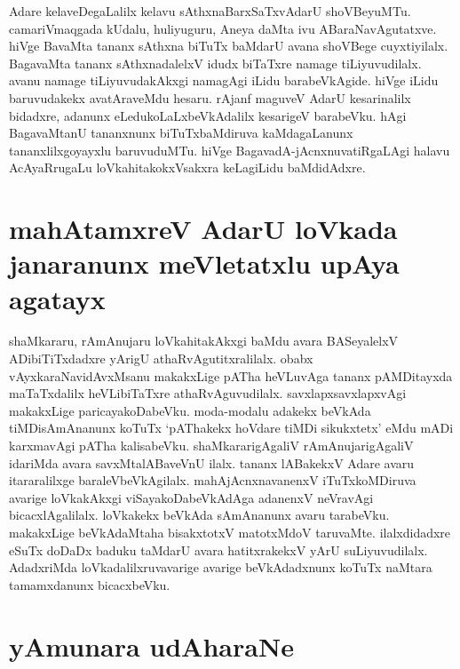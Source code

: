 Adare kelaveDegaLalilx kelavu sAthxnaBarxSaTxvAdarU shoVBeyuMTu. camariVmaqgada kUdalu, huliyuguru, Aneya daMta ivu ABaraNavAgutatxve. hiVge BavaMta tananx sAthxna biTuTx baMdarU avana shoVBege cuyxtiyilalx. BagavaMta tananx sAthxnadalelxV idudx biTaTxre namage tiLiyuvudilalx. avanu namage tiLiyuvudakAkxgi namagAgi iLidu barabeVkAgide. hiVge iLidu baruvudakekx  avatAraveMdu hesaru. rAjanf maguveV AdarU kesarinalilx bidadxre, adanunx eLedukoLaLxbeVkAdalilx kesarigeV barabeVku. hAgi BagavaMtanU tananxnunx biTuTxbaMdiruva kaMdagaLanunx tananxlilxgoyayxlu baruvuduMTu. hiVge BagavadA-jAcnxnuvatiRgaLAgi halavu AcAyaRrugaLu loVkahitakokxVsakxra keLagiLidu baMdidAdxre. 

\section*{mahAtamxreV AdarU loVkada janaranunx meVletatxlu upAya agatayx}

shaMkararu, rAmAnujaru loVkahitakAkxgi baMdu avara BASeyalelxV ADibiTiTxdadxre yArigU athaRvAgutitxralilalx. obabx vAyxkaraNavidAvxMsanu makakxLige pATha heVLuvAga tananx pAMDitayxda maTaTxdalilx heVLibiTaTxre athaRvAguvudilalx. savxlapxsavxlapxvAgi makakxLige paricayakoDabeVku. moda-modalu adakekx beVkAda tiMDisAmAnanunx koTuTx `pAThakekx hoVdare tiMDi sikukxtetx' eMdu mADi karxmavAgi pATha kalisabeVku. shaMkararigAgaliV rAmAnujarigAgaliV idariMda avara savxMtalABaveVnU ilalx. tananx lABakekxV Adare avaru itararalilxge baraleVbeVkAgilalx. mahAjAcnxnavanenxV iTuTxkoMDiruva avarige loVkakAkxgi viSayakoDabeVkAdAga adanenxV neVravAgi bicacxlAgalilalx. loVkakekx beVkAda sAmAnanunx avaru tarabeVku. makakxLige beVkAdaMtaha bisakxtotxV matotxMdoV taruvaMte. ilalxdidadxre eSuTx  doDaDx baduku taMdarU avara hatitxrakekxV yArU suLiyuvudilalx. AdadxriMda loVkadalilxruvavarige avarige beVkAdadxnunx koTuTx naMtara tamamxdanunx bicacxbeVku.


\section*{yAmunara udAharaNe}

